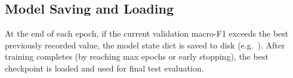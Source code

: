 \subsection{Model Saving and Loading}

At the end of each epoch, if the current validation macro-F1 exceeds the best previously recorded value, the model state dict is saved to disk (e.g.\ ). After training completes (by reaching max epochs or early stopping), the best checkpoint is loaded and used for final test evaluation.
